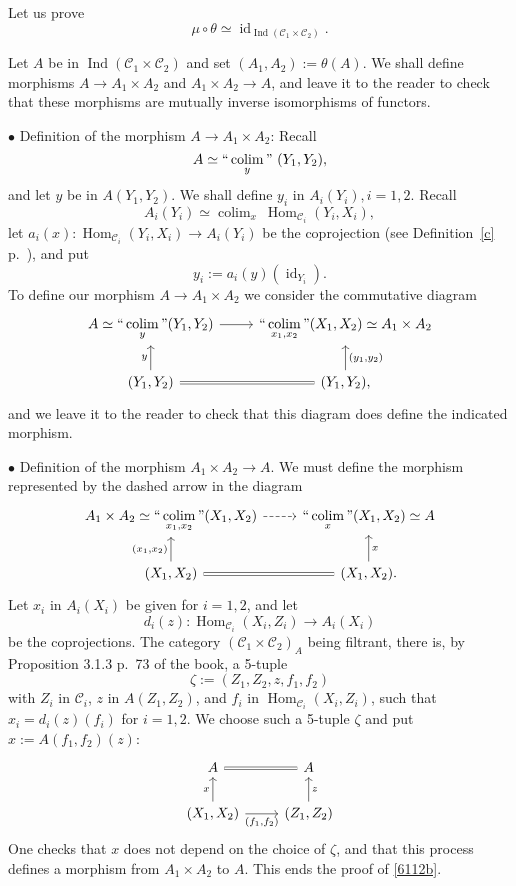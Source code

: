 \documentclass[12pt]{article}%
\theoremstyle{remark}
\theoremstyle{definition}
\newcommand{\bu}{\bullet}
\newcommand{\nn}{\noindent}
\newcommand{\C}{\mathcal C}
\DeclareMathOperator*{\colim}{colim}%
\DeclareMathOperator*{\ic}{``\colim"}
\DeclareMathOperator{\id}{id}
\DeclareMathOperator{\Hom}{Hom}%
\DeclareMathOperator{\Ind}{Ind}
\begin{document}
Let us prove
\begin{equation}\label{6112b}
\mu\circ\theta\simeq\id_{\Ind(\C_1\times\C_2)}.
\end{equation}

Let $A$ be in $\Ind(\C_1\times\C_2)$ and set $(A_1,A_2):=\theta(A)$. We shall define morphisms $A\to A_1\times A_2$ and $A_1\times A_2\to A$, and leave it to the reader to check that these morphisms are mutually inverse isomorphisms of functors. 

\nn$\bu$ Definition of the morphism $A\to A_1\times A_2$: Recall 
$$
A\simeq\ic_y\ (Y_1,Y_2), 
$$ 
and let $y$ be in $A(Y_1,Y_2)$. We shall define $y_i$ in $A_i(Y_i),i=1,2$. Recall 
$$
A_i(Y_i)\simeq\colim_x\ \Hom_{\C_i}(Y_i,X_i), 
$$ 
let $a_i(x):\Hom_{\C_i}(Y_i,X_i)\to A_i(Y_i)$ be the coprojection (see Definition~\ref{c} p.~\pageref{c}), and put 
$$
y_i:=a_i(y)(\id_{Y_i}). 
$$ 
To define our morphism $A\to A_1\times A_2$ we consider the commutative diagram
$$
\begin{tikzcd}
A\simeq\ds\ic_y(Y_1,Y_2)\ar{r}&\ds\ic_{x_1,x_2}(X_1,X_2)\simeq A_1\times A_2\\ 
(Y_1,Y_2)\ar{u}{y}\ar[equal]{r}&(Y_1,Y_2),\ar{u}[swap]{(y_1,y_2)}
\end{tikzcd}
$$ 
and we leave it to the reader to check that this diagram does define the indicated morphism.

\nn$\bu$ Definition of the morphism $A_1\times A_2\to A$. We must define the morphism represented by the dashed arrow in the diagram  
$$
\begin{tikzcd}
A_1\times A_2\simeq\ds\ic_{x_1,x_2}(X_1,X_2)\ar[dashed]{r}&\ds\ic_x(X_1,X_2)\simeq A\\ 
(X_1,X_2)\ar{u}{(x_1,x_2)}\ar[equal]{r}&(X_1,X_2).\ar{u}[swap]{x}
\end{tikzcd}
$$ 
Let $x_i$ in $A_i(X_i)$ be given for $i=1,2$, and let
$$
d_i(z):\Hom_{\C_i}(X_i,Z_i)\to A_i(X_i)
$$
be the coprojections. The category $(\C_1\times\C_2)_A$ being filtrant, there is, by Proposition 3.1.3 p.~73 of the book, a 5-tuple 
$$
\zeta:=(Z_1,Z_2,z,f_1,f_2)
$$ 
with $Z_i$ in $\C_i$, $z$ in $A(Z_1,Z_2)$, and $f_i$ in $\Hom_{\C_i}(X_i,Z_i)$, such that $x_i=d_i(z)(f_i)$ for $i=1,2$. We choose such a 5-tuple $\zeta$ and put $x:=A(f_1,f_2)(z)$:
$$
\begin{tikzcd}
A\ar[equal]{r}&A\\ 
(X_1,X_2)\ar{u}{x}\ar{r}[swap]{(f_1,f_2)}&(Z_1,Z_2)\ar{u}[swap]{z}
\end{tikzcd}
$$ 
One checks that $x$ does not depend on the choice of $\zeta$, and that this process defines a morphism from $A_1\times A_2$ to $A$. This ends the proof of \eqref{6112b}.
\end{document}
